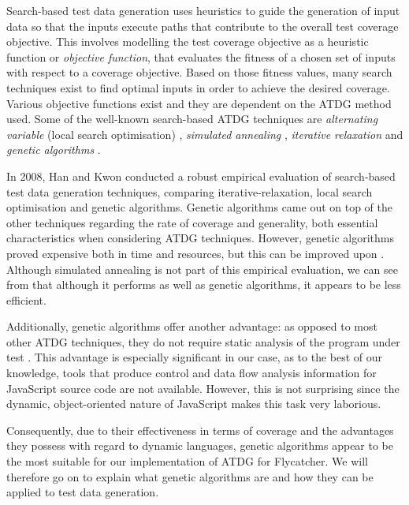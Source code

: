 \documentclass[a4paper,11pt,titlepage]{report}
\begin{document}
Search-based test data generation uses heuristics to guide the generation of input data so that the inputs execute paths that contribute to the overall test coverage objective. This involves modelling the test coverage objective as a heuristic function or \emph{objective function}, that evaluates the fitness of a chosen set of inputs with respect to a coverage objective. Based on those fitness values, many search techniques exist to find optimal inputs in order to achieve the desired coverage. Various objective functions exist and they are dependent on the ATDG method used. Some of the well-known search-based ATDG techniques are \emph{alternating variable} (local search optimisation) \cite{korel1990automated, gallagher1997adtest}, \emph{simulated annealing} \cite{tracey1998automated,tracey1998way}, \emph{iterative relaxation} \cite{gupta1998automated} and \emph{genetic algorithms} \cite{michael1998automated,michael2001generating}.
	
In 2008, Han and Kwon \cite{han2008empirical} conducted a robust empirical evaluation of search-based test data generation techniques, comparing iterative-relaxation, local search optimisation and genetic algorithms. Genetic algorithms came out on top of the other techniques regarding the rate of coverage and generality, both essential characteristics when considering ATDG techniques. However, genetic algorithms proved expensive both in time and resources, but this can be improved upon \cite{han2008empirical}.
Although simulated annealing is not part of this empirical evaluation, we can see from \cite{michael1998automated} that although it performs as well as genetic algorithms, it appears to be less efficient.

Additionally, genetic algorithms offer another advantage: as opposed to most other ATDG techniques, they do not require static analysis of the program under test \cite{han2008empirical}. This advantage is especially significant in our case, as to the best of our knowledge, tools that produce control and data flow analysis information for JavaScript source code are not available. However, this is not surprising since the dynamic, object-oriented nature of JavaScript makes this task very laborious.

Consequently, due to their effectiveness in terms of coverage and the advantages they possess with regard to dynamic languages, genetic algorithms appear to be the most suitable for our implementation of ATDG for Flycatcher. We will therefore go on to explain what genetic algorithms are and how they can be applied to test data generation.
\end{document}
